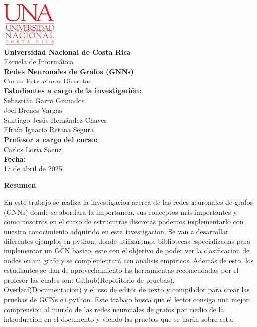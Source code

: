 \documentclass[11pt]{article} %
\begin{document}
\begin{titlepage}
    \thispagestyle{empty}
    \begin{spacing}{1.5}
    \begin{center}
        \includegraphics[width=0.2\textwidth]{Images/LogoUNA.svg.png} \\[30pt]
        {\Large \textbf{Universidad Nacional de Costa Rica}} \\[20pt] 
        {\Large Escuela de Informática} \\[20pt]
        {\Large \textbf{Redes Neuronales de Grafos (GNNs)}} \\[20pt]
        {\Large Curso: Estructuras Discretas} \\[20pt]
        {\Large \textbf{Estudiantes a cargo de la investigación:}} \\[10pt]
        {\large Sebastián Garro Granados \\ Joel Brenes Vargas \\ Santiago Jesús Hernández Chaves \\ Efraín Ignacio Retana Segura} \\[20pt]
        {\Large \textbf{Profesor a cargo del curso:}} \\[15pt]
        {\large Carlos Loría Saenz} \\[120pt]
        {\Large \textbf{Fecha:}} \\[15pt]
        {\large 17 de abril de 2025}
    \end{center}
    \end{spacing}
\end{titlepage}

\newpage
\thispagestyle{empty}
{\large \textbf{Resumen}}
\vspace{5pt}

En este trabajo se realiza la investigacion acerca de las redes neuronales de grafos (GNNs) donde se abordara la importancia, sus conceptos más importantes y como nosotros en el curso de estrucutras discretas podemos implementarlo con nuestro conocimiento adquirido en esta investigacion. Se van a desarrollar diferentes ejemplos en python, donde utilizaremos bibliotecas especializadas para implementar un GCN basico, este con el objetivo de poder ver la clasificacion de nodos en un grafo y se complementará con analisis empiricos. Además de esto, los estudiantes se dan de aprovechamiento las herramientas recomendadas por el profesor las cuales son: Github(Repositorio de pruebas), Overleaf(Documentacion) y el uso de editor de texto y compilador para crear las pruebas de GCNs en python. Este trabajo busca que el lector consiga una mejor comprension al mundo de las redes neuronales de grafos por medio de la introduccion en el documento y viendo las pruebas que se harán sobre esta. %
\end{document}
